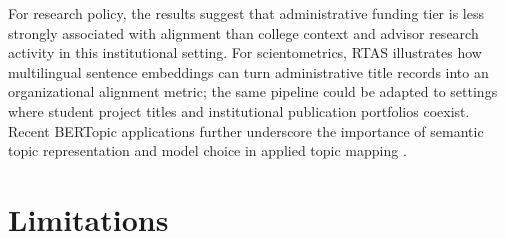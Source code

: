 \documentclass[11pt]{article}
\begin{document}
For research policy, the results suggest that administrative funding tier is less strongly associated with alignment than college context and advisor research activity in this institutional setting. For scientometrics, RTAS illustrates how multilingual sentence embeddings can turn administrative title records into an organizational alignment metric; the same pipeline could be adapted to settings where student project titles and institutional publication portfolios coexist. Recent BERTopic applications further underscore the importance of semantic topic representation and model choice in applied topic mapping \citep{yangkim2025bertopic,benz2025mapping,wang2024bertopic}.

\section{Limitations}
\label{sec:limitations}
\end{document}

